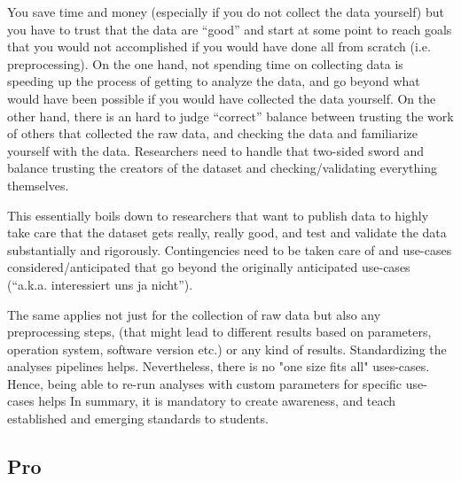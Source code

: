 %
You save time and money (especially if you do not collect the data yourself) but
you have to trust that the data are ``good'' and start at some point to reach
goals that you would not accomplished if you would have done all from scratch
(i.e. preprocessing).
%
On the one hand, not spending time on collecting data is speeding up the process
of getting to analyze the data, and go beyond what would have been possible if
you would have collected the data yourself.
%
On the other hand, there is an hard to judge ``correct'' balance between
trusting the work of others that collected the raw data, and checking the data
and familiarize yourself with the data.
%
Researchers need to handle that two-sided sword and balance trusting the
creators of the dataset and checking/validating everything themselves.

%
This essentially boils down to researchers that want to publish data to highly
take care that the dataset gets really, really good, and test and validate the
data substantially and rigorously.
%
Contingencies need to be taken care of and use-cases considered/anticipated that
go beyond the originally anticipated use-cases (``a.k.a. interessiert uns ja
nicht'').

%
The same applies not just for the collection of raw data but also any
preprocessing steps, (that might lead to different results based on parameters,
operation system, software version etc.) or any kind of results.
%
Standardizing the analyses pipelines helps.
%
Nevertheless, there is no "one size fits all" uses-cases.
%
Hence, being able to re-run analyses with custom parameters for specific
use-cases helps
%
In summary, it is mandatory to create awareness, and teach established and
emerging standards to students.



\subsection{Pro}






